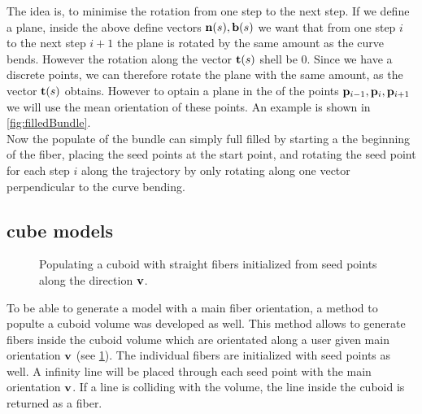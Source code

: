 The idea is, to minimise the rotation from one step to the next step.
If we define a plane, inside the above define vectors $\mathbf{n}(s),\mathbf{b}(s)$ we want that from one step $i$ to the next step $i+1$ the plane is rotated by the same amount as the curve bends.
However the rotation along the vector $\mathbf{t}(s)$ shell be $0$.
Since we have a discrete points, we can therefore rotate the plane with the same amount, as the vector $\mathbf{t}(s)$ obtains.
However to optain a plane in the  of the points $\mathbf{p}_{i-1}, \mathbf{p}_{i}, \mathbf{p}_{i+1}$ we will use the mean orientation of these points.
An example is shown in \cref{fig:filledBundle}.
\\
% 
Now the populate of the bundle can simply full filled by starting a the beginning of the fiber, placing the seed points at the start point, and rotating the seed point for each step $i$ along the trajectory by only rotating along one vector perpendicular to the curve bending.
% 
\subsection{cube models}
% 
\begin{figure}[!t]
    \centering
    \def\tikzwidth{0.5\textwidth}
	\caption{Populating a cuboid with straight fibers initialized from seed points along the direction $\mathbf{v}$.}
    \label{fig:cubeBuild}%
\end{figure}
% 
To be able to generate a model with a main fiber orientation, a method to populte a cuboid volume was developed as well.
This method allows to generate fibers inside the cuboid volume which are orientated along a user given main orientation $\mathbf{v}$ (see \cref{fig:cubeBuild}). 
The individual fibers are initialized with seed points as well.
A infinity line will be placed through each seed point with the main orientation $\mathbf{v}$.
If a line is colliding with the volume, the line inside the cuboid is returned as a fiber.
% 
